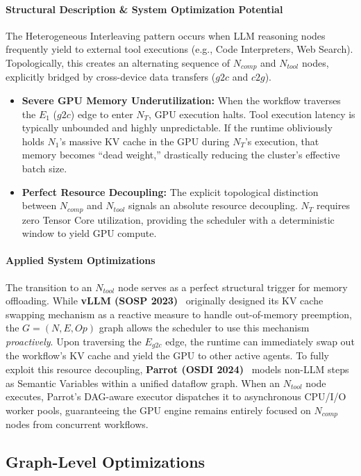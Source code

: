 \paragraph{Structural Description \& System Optimization Potential}
The Heterogeneous Interleaving pattern occurs when LLM reasoning nodes frequently yield to external tool executions (e.g., Code Interpreters, Web Search). Topologically, this creates an alternating sequence of $N_{comp}$ and $N_{tool}$ nodes, explicitly bridged by cross-device data transfers ($g2c$ and $c2g$).
\begin{itemize}
    \item \textbf{Severe GPU Memory Underutilization:} When the workflow traverses the $E_1$ ($g2c$) edge to enter $N_T$, GPU execution halts. Tool execution latency is typically unbounded and highly unpredictable. If the runtime obliviously holds $N_1$'s massive KV cache in the GPU during $N_T$'s execution, that memory becomes ``dead weight,'' drastically reducing the cluster's effective batch size.
    \item \textbf{Perfect Resource Decoupling:} The explicit topological distinction between $N_{comp}$ and $N_{tool}$ signals an absolute resource decoupling. $N_T$ requires zero Tensor Core utilization, providing the scheduler with a deterministic window to yield GPU compute.
\end{itemize}

\paragraph{Applied System Optimizations}
The transition to an $N_{tool}$ node serves as a perfect structural trigger for memory offloading. While \textbf{vLLM (SOSP 2023)}~\citep{kwon2023efficient} originally designed its KV cache swapping mechanism as a reactive measure to handle out-of-memory preemption, the $G=(N, E, Op)$ graph allows the scheduler to use this mechanism \textit{proactively}. Upon traversing the $E_{g2c}$ edge, the runtime can immediately swap out the workflow's KV cache and yield the GPU to other active agents. To fully exploit this resource decoupling, \textbf{Parrot (OSDI 2024)}~\citep{lin2024parrot} models non-LLM steps as Semantic Variables within a unified dataflow graph. When an $N_{tool}$ node executes, Parrot's DAG-aware executor dispatches it to asynchronous CPU/I/O worker pools, guaranteeing the GPU engine remains entirely focused on $N_{comp}$ nodes from concurrent workflows.


\subsection{Graph-Level Optimizations}
\label{sec:graph_level_optimizations}

